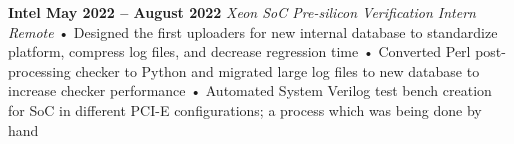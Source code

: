 \documentclass[../main.tex]{subfiles}
\begin{document}
%
\noindent\textbf{{\fontsize{\textFontSize}{\textFontBox}\selectfont Intel \hfill May 2022 – August 2022}}
\vspace{\jobHeaderDist}\newline
%
{\fontsize{\textFontSize}{\textFontBox}\selectfont\emph{Xeon SoC Pre-silicon Verification Intern \hfill Remote \hspace{0 cm}}}
\newline
%
%
{\fontsize{\textFontSize}{\textFontBox}\selectfont • \hspace{1mm} Designed the first uploaders for new internal database to standardize platform, compress log files, and decrease regression time }\newline
{\fontsize{\textFontSize}{\textFontBox}\selectfont • \hspace{1mm} Converted Perl post-processing checker to Python and migrated large log files to new database to increase checker performance }\newline
{\fontsize{\textFontSize}{\textFontBox}\selectfont • \hspace{1mm} Automated System Verilog test bench creation for SoC in different PCI-E configurations; a process which was being done by hand }\vspace{-5mm}\newline
%
%
\end{document}
